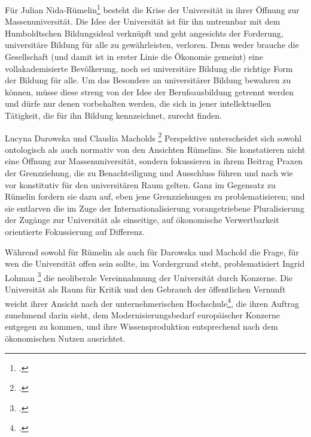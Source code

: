   Für Julian Nida-Rümelin\footnotemark \footcitetext{nida} besteht die Krise
  der Universität in ihrer Öffnung zur Massenuniversität. Die Idee der
  Universität ist für ihn untrennbar mit dem \glqq Humboldtschen Bildungsideal\grqq\footnotemark {} verknüpft und geht angesichts der
Forderung, universitäre Bildung für alle zu gewährleisten, verloren. Denn weder
brauche die Gesellschaft (und damit ist in erster Linie die Ökonomie gemeint)
eine vollakademisierte Bevölkerung, noch sei universitäre Bildung die richtige
Form der Bildung für alle. Um das Besondere an universitärer Bildung bewahren
zu können, müsse diese streng von der Idee der Berufsausbildung getrennt werden
und dürfe nur denen vorbehalten werden, die sich in jener intellektuellen
Tätigkeit, die für ihn Bildung kennzeichnet, zurecht finden. 

Lucyna Darowska und Claudia Macholds \footnotemark \footcitetext{lucyna} Perspektive unterscheidet sich sowohl ontologisch als
auch normativ von den Ansichten Rümelins. Sie konstatieren nicht eine Öffnung
zur Massenuniversität, sondern fokussieren in ihrem Beitrag Praxen der
Grenzziehung, die zu Benachteiligung und Ausschluss führen und nach wie vor
konstitutiv für den universitären Raum gelten. Ganz im Gegensatz zu Rümelin
fordern sie dazu auf, eben jene Grenzziehungen zu problematisieren; und sie
entlarven die im Zuge der Internationalisierung vorangetriebene Pluralisierung
der Zugänge zur Universität als einseitige, auf ökonomische Verwertbarkeit
orientierte Fokussierung auf Differenz.  

Während sowohl für Rümelin als auch
für Darowska und Machold die Frage, für wen die Universität offen sein sollte,
im Vordergrund steht, problematisiert Ingrid Lohman \footnotemark
\footcitetext{lohman} die neoliberale
Vereinnahmung der Universität durch Konzerne. Die Universität als Raum für
Kritik und den Gebrauch der öffentlichen Vernunft weicht ihrer Ansicht nach der
\glqq unternehmerischen Hochschule\grqq\footnotemark \footcitetext{lohmein}, die ihren Auftrag zunehmend darin sieht, dem
Modernisierungsbedarf europäischer Konzerne entgegen zu kommen, und ihre
Wissensproduktion entsprechend nach dem ökonomischen Nutzen ausrichtet. 

